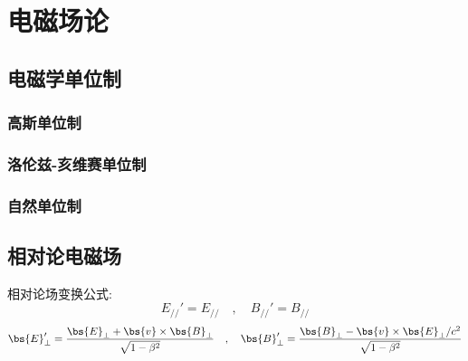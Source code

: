 \chapter{电磁场论}


\section{电磁学单位制}

\subsection{高斯单位制}

\subsection{洛伦兹-亥维赛单位制}

\subsection{自然单位制}

\section{相对论电磁场}

相对论场变换公式:
\[E_{//}'=E_{//}\quad ,\quad B_{//}'=B_{//}\]
\[\bs{E}_\perp'=\frac{\bs{E}_\perp+\bs{v}\times \bs{B}_\perp}{\sqrt{1-\beta^2}}\quad,\quad \bs{B}_\perp'=\frac{\bs{B}_\perp-\bs{v}\times \bs{E}_\perp/c^2}{\sqrt{1-\beta^2}}\]

